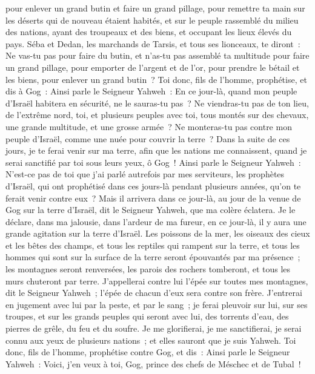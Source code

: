 \begin{multicols}{2}
pour enlever un grand butin et faire un grand pillage, pour remettre ta main sur les déserts qui de nouveau étaient habités, et sur le peuple rassemblé du milieu des nations, ayant des troupeaux et des biens, et occupant les lieux élevés du pays.
Séba et Dedan, les marchands de Tarsis, et tous ses lionceaux, te diront~: Ne vas-tu pas pour faire du butin, et n'as-tu pas assemblé ta multitude pour faire un grand pillage, pour emporter de l'argent et de l'or, pour prendre le bétail et les biens, pour enlever un grand butin~?
Toi donc, fils de l'homme, prophétise, et dis à Gog~: Ainsi parle le Seigneur Yahweh~: En ce jour-là, quand mon peuple d'Israël habitera en sécurité, ne le sauras-tu pas~?
Ne viendras-tu pas de ton lieu, de l'extrême nord, toi, et plusieurs peuples avec toi, tous montés sur des chevaux, une grande multitude, et une grosse armée~?
Ne monteras-tu pas contre mon peuple d'Israël, comme une nuée pour couvrir la terre~? Dans la suite de ces jours, je te ferai venir sur ma terre, afin que les nations me connaissent, quand je serai sanctifié par toi sous leurs yeux, ô Gog~!
Ainsi parle le Seigneur Yahweh~: N'est-ce pas de toi que j'ai parlé autrefois par mes serviteurs, les prophètes d'Israël, qui ont prophétisé dans ces jours-là pendant plusieurs années, qu'on te ferait venir contre eux~?
Mais il arrivera dans ce jour-là, au jour de la venue de Gog sur la terre d'Israël, dit le Seigneur Yahweh, que ma colère éclatera.
Je le déclare, dans ma jalousie, dans l'ardeur de ma fureur, en ce jour-là, il y aura une grande agitation sur la terre d'Israël.
Les poissons de la mer, les oiseaux des cieux et les bêtes des champs, et tous les reptiles qui rampent sur la terre, et tous les hommes qui sont sur la surface de la terre seront épouvantés par ma présence~; les montagnes seront renversées, les parois des rochers tomberont, et tous les murs chuteront par terre.
J'appellerai contre lui l'épée sur toutes mes montagnes, dit le Seigneur Yahweh~; l'épée de chacun d'eux sera contre son frère.
J'entrerai en jugement avec lui par la peste, et par le sang~; je ferai pleuvoir sur lui, sur ses troupes, et sur les grands peuples qui seront avec lui, des torrents d'eau, des pierres de grêle, du feu et du soufre.
Je me glorifierai, je me sanctifierai, je serai connu aux yeux de plusieurs nations~; et elles sauront que je suis Yahweh.
\VerseOne{}Toi donc, fils de l'homme, prophétise contre Gog, et dis~: Ainsi parle le Seigneur Yahweh~: Voici, j'en veux à toi, Gog, prince des chefs de Méschec et de Tubal~!

\end{multicols}
